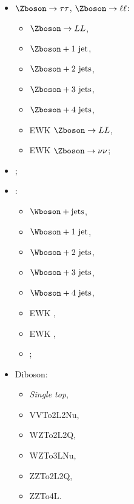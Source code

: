 \begin{minipage}[t]{.3\textwidth}
\begin{itemize}
\item $\Zboson\to\tau\tau$, $\Zboson\to\ell\ell$:
\begin{itemize}
\item $\Zboson \to LL$,
\item $\Zboson+\text{1 jet}$,
\item $\Zboson+\text{2 jets}$,
\item $\Zboson+\text{3 jets}$,
\item $\Zboson+\text{4 jets}$,
\item EWK $\Zboson\to LL$,
\item EWK $\Zboson\to \nu\nu$;
\end{itemize}
\item \ttbar;
\end{itemize}
\end{minipage}
\hfill
\begin{minipage}[t]{.3\textwidth}
\begin{itemize}
\item \Wjets:
\begin{itemize}
\item $\Wboson+\text{jets}$,
\item $\Wboson+\text{1 jet}$,
\item $\Wboson+\text{2 jets}$,
\item $\Wboson+\text{3 jets}$,
\item $\Wboson+\text{4 jets}$,
\item EWK \Wbosonminus,
\item EWK \Wbosonplus,
\item \Wboson\photon;
\end{itemize}
\end{itemize}
\end{minipage}
\hfill
\begin{minipage}[t]{.3\textwidth}
\begin{itemize}
\item Diboson:
\begin{itemize}
\item \emph{Single top},
\item VVTo2L2Nu,
\item WZTo2L2Q,
\item WZTo3LNu,
\item ZZTo2L2Q,
\item ZZTo4L.
\end{itemize}
\end{itemize}
\end{minipage}

